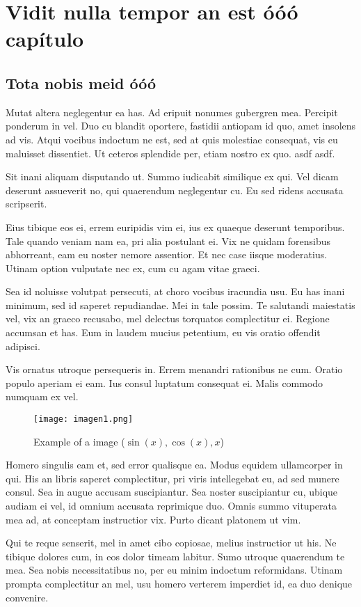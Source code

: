 \chapter{Vidit nulla tempor an est óóó capítulo}
\section{Tota nobis meid óóó}
Mutat altera neglegentur ea has. Ad eripuit nonumes gubergren mea. Percipit ponderum in vel. Duo cu blandit oportere, fastidii antiopam id quo, amet insolens ad vis. Atqui vocibus indoctum ne est, sed at quis molestiae consequat, vis eu maluisset dissentiet. Ut ceteros splendide per, etiam nostro ex quo. asdf \cite{einstein} asdf. %

Sit inani aliquam disputando ut. Summo iudicabit similique ex qui. Vel dicam deserunt assueverit no, qui quaerendum neglegentur cu. Eu sed ridens accusata scripserit.

Eius tibique eos ei, errem euripidis vim ei, ius ex quaeque deserunt temporibus. Tale quando veniam nam ea, pri alia postulant ei. Vix ne quidam forensibus abhorreant, eam eu noster nemore assentior. Et nec case iisque moderatius. Utinam option vulputate nec ex, cum cu agam vitae graeci.

Sea id noluisse volutpat persecuti, at choro vocibus iracundia usu. Eu has inani minimum, sed id saperet repudiandae. Mei in tale possim. Te salutandi maiestatis vel, vix an graeco recusabo, mel delectus torquatos complectitur ei. Regione accumsan et has. Eum in laudem mucius petentium, eu vis oratio offendit adipisci.

Vis ornatus utroque persequeris in. Errem menandri rationibus ne cum. Oratio populo aperiam ei eam. Ius consul luptatum consequat ei. Malis commodo numquam ex vel.


\begin{figure}[h]
\caption{Example of a image ($\sin (x), \cos(x), x$)}
\centering
\texttt{[image: imagen1.png]}
\end{figure}

Homero singulis eam et, sed error qualisque ea. Modus equidem ullamcorper in qui. His an libris saperet complectitur, pri viris intellegebat eu, ad sed munere consul. Sea in augue accusam suscipiantur. Sea noster suscipiantur cu, ubique audiam ei vel, id omnium accusata reprimique duo. Omnis summo vituperata mea ad, at conceptam instructior vix. Purto dicant platonem ut vim.

Qui te reque senserit, mel in amet cibo copiosae, melius instructior ut his. Ne tibique dolores cum, in eos dolor timeam labitur. Sumo utroque quaerendum te mea. Sea nobis necessitatibus no, per eu minim indoctum reformidans. Utinam prompta complectitur an mel, usu homero verterem imperdiet id, ea duo denique convenire.

